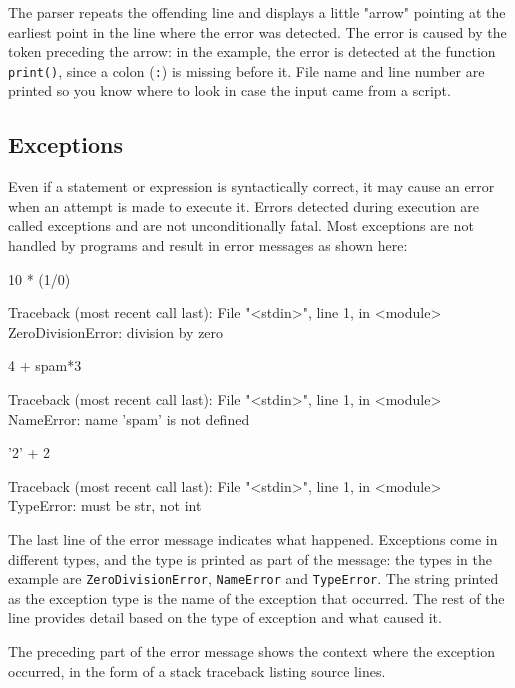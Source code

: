 The parser repeats the offending line and displays a little "arrow" pointing at the earliest point in the line where the error was detected. The error is caused by the token preceding the arrow: in the example, the error is detected at the function \texttt{print()}, since a colon (\texttt{:}) is missing before it. File name and line number are printed so you know where to look in case the input came from a script.

\subsection{Exceptions}
Even if a statement or expression is syntactically correct, it may cause an error when an attempt is made to execute it. Errors detected during execution are called exceptions and are not unconditionally fatal. Most exceptions are not handled by programs and result in error messages as shown here:

\begin{ipythonnon}
10 * (1/0)
\end{ipythonnon}
\begin{ioutput}
Traceback (most recent call last):
  File "<stdin>", line 1, in <module>
ZeroDivisionError: division by zero
\end{ioutput}

\begin{ipythonnon}
4 + spam*3
\end{ipythonnon}
\begin{ioutput}
Traceback (most recent call last):
  File "<stdin>", line 1, in <module>
NameError: name 'spam' is not defined
\end{ioutput}

\begin{ipythonnon}
'2' + 2
\end{ipythonnon}
\begin{ioutput}
Traceback (most recent call last):
  File "<stdin>", line 1, in <module>
TypeError: must be str, not int
\end{ioutput}

The last line of the error message indicates what happened. Exceptions come in different types, and the type is printed as part of the message: the types in the example are \texttt{ZeroDivisionError}, \texttt{NameError} and \texttt{TypeError}. The string printed as the exception type is the name of the exception that occurred. The rest of the line provides detail based on the type of exception and what caused it.

The preceding part of the error message shows the context where the exception occurred, in the form of a stack traceback listing source lines.

